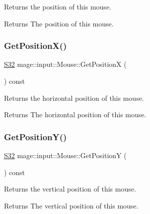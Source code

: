Returns the position of this mouse.

\begin{DoxyReturn}{Returns}
The position of this mouse. 
\end{DoxyReturn}
\mbox{\label{classmage_1_1input_1_1_mouse_a208f26babea7ac6e07af5f79600e22ae}} 
\subsubsection{\texorpdfstring{Get\+Position\+X()}{GetPositionX()}}
{\footnotesize\ttfamily \mbox{\hyperlink{namespacemage_a2ef1a005a77358f1825d13fd481b557f}{S32}} mage\+::input\+::\+Mouse\+::\+Get\+PositionX (\begin{DoxyParamCaption}{ }\end{DoxyParamCaption}) const\hspace{0.3cm}{\ttfamily [noexcept]}}

Returns the horizontal position of this mouse.

\begin{DoxyReturn}{Returns}
The horizontal position of this mouse. 
\end{DoxyReturn}
\mbox{\label{classmage_1_1input_1_1_mouse_a81bf0ebd5fb34a25ba9f5d4c7aea1ed6}} 
\subsubsection{\texorpdfstring{Get\+Position\+Y()}{GetPositionY()}}
{\footnotesize\ttfamily \mbox{\hyperlink{namespacemage_a2ef1a005a77358f1825d13fd481b557f}{S32}} mage\+::input\+::\+Mouse\+::\+Get\+PositionY (\begin{DoxyParamCaption}{ }\end{DoxyParamCaption}) const\hspace{0.3cm}{\ttfamily [noexcept]}}

Returns the vertical position of this mouse.

\begin{DoxyReturn}{Returns}
The vertical position of this mouse. 
\end{DoxyReturn}
\mbox{\label{classmage_1_1input_1_1_mouse_a5fd893af2aede58106b718448e7e0dde}} 
